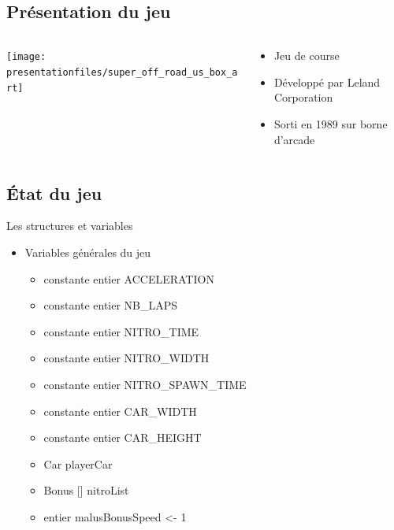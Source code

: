\documentclass[10pt,dvipsnames,final]{beamer}
\newcommand{\midcolumn}[2]{
\begin{columns}
	\begin{column}{0.5\textwidth}
		#1
	\end{column}
	\begin{column}{0.5\textwidth}
		#2
	\end{column}
\end{columns}
}
\begin{document}
\subsection{Présentation du jeu}

\begin{frame}
\midcolumn{\texttt{[image: presentationfiles/super\_off\_road\_us\_box\_art]}}{
\begin{itemize}
	\item Jeu de course
	\item Développé par Leland Corporation
	\item Sorti en 1989 sur borne d'arcade
\end{itemize}
}
\end{frame}

\subsection{État du jeu}

\begin{frame}{Les structures et variables}
\begin{itemize}
\item Variables générales du jeu
\begin{itemize}
\item constante entier ACCELERATION
\item constante entier NB\_LAPS
\item constante entier NITRO\_TIME
\item constante entier NITRO\_WIDTH
\item constante entier NITRO\_SPAWN\_TIME
\item constante entier CAR\_WIDTH
\item constante entier CAR\_HEIGHT
\item Car playerCar
\item Bonus [] nitroList
\item entier malusBonusSpeed <- 1
\end{itemize}
\end{itemize}
\end{frame}
\end{document}
